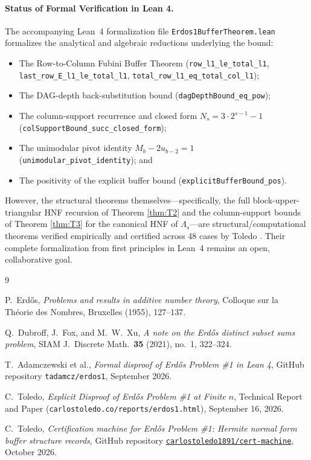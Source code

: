 \documentclass[11pt,a4paper]{article}
\theoremstyle{plain}
\theoremstyle{definition}
\begin{document}
\paragraph{Status of Formal Verification in Lean 4.}
The accompanying Lean~4 formalization file \texttt{Erdos1BufferTheorem.lean} formalizes the analytical and algebraic reductions underlying the bound:
\begin{itemize}[nosep]
\item The Row-to-Column Fubini Buffer Theorem (\texttt{row\_l1\_le\_total\_l1}, \texttt{last\_row\_E\_l1\_le\_total\_l1}, \texttt{total\_row\_l1\_eq\_total\_col\_l1});
\item The DAG-depth back-substitution bound (\texttt{dagDepthBound\_eq\_pow});
\item The column-support recurrence and closed form $N_s = 3 \cdot 2^{s-1} - 1$ (\texttt{colSupportBound\_succ\_closed\_form});
\item The unimodular pivot identity $M_b - 2 u_{b-2} = 1$ (\texttt{unimodular\_pivot\_identity}); and
\item The positivity of the explicit buffer bound (\texttt{explicitBufferBound\_pos}).
\end{itemize}
However, the structural theorems themselves---specifically, the full block-upper-triangular HNF recursion of Theorem \ref{thm:T2} and the column-support bounds of Theorem \ref{thm:T3} for the canonical HNF of $\Lambda_s$---are structural/computational theorems verified empirically and certified across 48 cases by Toledo \cite{ToledoCert26}. Their complete formalization from first principles in Lean~4 remains an open, collaborative goal.

\begin{thebibliography}{9}

P.~Erd\H{o}s, \emph{Problems and results in additive number theory}, Colloque sur la Th\'eorie des Nombres, Bruxelles (1955), 127--137.

Q.~Dubroff, J.~Fox, and M.~W.~Xu, \emph{A note on the Erd\H{o}s distinct subset sums problem}, SIAM J.~Discrete Math.\ \textbf{35} (2021), no.~1, 322--324.

T.~Adamczewski et al., \emph{Formal disproof of Erd\H{o}s Problem \#1 in Lean 4}, GitHub repository \texttt{tadamcz/erdos1}, September 2026.

C.~Toledo, \emph{Explicit Disproof of Erd\H{o}s Problem \#1 at Finite $n$}, Technical Report and Paper (\texttt{carlostoledo.co/reports/erdos1.html}), September 16, 2026.

C.~Toledo, \emph{Certification machine for Erd\H{o}s Problem \#1: Hermite normal form buffer structure records}, GitHub repository \href{https://github.com/carlostoledo1891/cert-machine/blob/main/certs/erdos1/buffer-structure.json}{\texttt{carlostoledo1891/cert-machine}}, October 2026.

\end{thebibliography}
\end{document}
